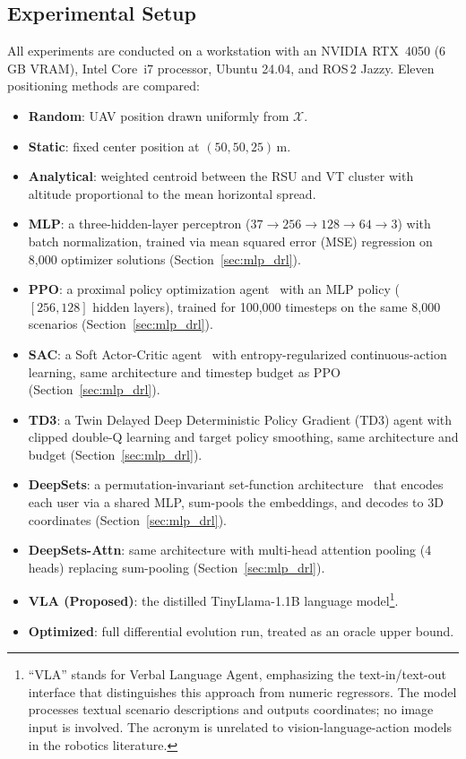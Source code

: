 \documentclass[journal]{IEEEtran}
\begin{document}
\subsection{Experimental Setup}

All experiments are conducted on a workstation with an NVIDIA RTX~4050 (6\,GB VRAM), Intel Core~i7 processor, Ubuntu 24.04, and ROS\,2 Jazzy. Eleven positioning methods are compared:

\begin{itemize}
    \item \textbf{Random}: UAV position drawn uniformly from $\mathcal{X}$.
    \item \textbf{Static}: fixed center position at $(50, 50, 25)$\,m.
    \item \textbf{Analytical}: weighted centroid between the RSU and VT cluster with altitude proportional to the mean horizontal spread.
    \item \textbf{MLP}: a three-hidden-layer perceptron ($37 \to 256 \to 128 \to 64 \to 3$) with batch normalization, trained via mean squared error (MSE) regression on 8{,}000 optimizer solutions (Section~\ref{sec:mlp_drl}).
    \item \textbf{PPO}: a proximal policy optimization agent~\cite{schulman2017ppo} with an MLP policy ($[256, 128]$ hidden layers), trained for 100{,}000 timesteps on the same 8{,}000 scenarios (Section~\ref{sec:mlp_drl}).
    \item \textbf{SAC}: a Soft Actor-Critic agent~\cite{haarnoja2018sac} with entropy-regularized continuous-action learning, same architecture and timestep budget as PPO (Section~\ref{sec:mlp_drl}).
    \item \textbf{TD3}: a Twin Delayed Deep Deterministic Policy Gradient (TD3) agent with clipped double-Q learning and target policy smoothing, same architecture and budget (Section~\ref{sec:mlp_drl}).
    \item \textbf{DeepSets}: a permutation-invariant set-function architecture~\cite{zaheer2017deepsets} that encodes each user via a shared MLP, sum-pools the embeddings, and decodes to 3D coordinates (Section~\ref{sec:mlp_drl}).
    \item \textbf{DeepSets-Attn}: same architecture with multi-head attention pooling (4 heads) replacing sum-pooling (Section~\ref{sec:mlp_drl}).
    \item \textbf{VLA (Proposed)}: the distilled TinyLlama-1.1B language model\footnote{``VLA'' stands for Verbal Language Agent, emphasizing the text-in/text-out interface that distinguishes this approach from numeric regressors. The model processes textual scenario descriptions and outputs coordinates; no image input is involved. The acronym is unrelated to vision-language-action models in the robotics literature.}.
    \item \textbf{Optimized}: full differential evolution run, treated as an oracle upper bound.
\end{itemize}
\end{document}
